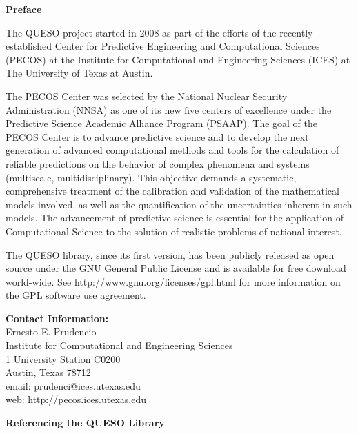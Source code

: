 \clearpage
\thispagestyle{empty}
\centerline{\Large\bf Preface}
$~$\\
The QUESO project started in 2008 as part
of the efforts of the recently established Center for Predictive Engineering and Computational Sciences (PECOS)
at the Institute for Computational and Engineering Sciences (ICES) at The University of Texas at Austin.

The PECOS Center was selected by the National Nuclear Security Administration (NNSA) as one of its new five centers of excellence
under the Predictive Science Academic Alliance Program (PSAAP).
The goal of the PECOS Center is
to advance predictive science and to develop the next generation of advanced computational methods and tools
for the calculation of reliable predictions on the behavior of complex phenomena and systems (multiscale, multidisciplinary).
This objective demands a systematic, comprehensive treatment of the calibration and validation of the mathematical models involved,
as well as the quantification of the uncertainties inherent in such models.
The advancement of predictive science is essential for the application of Computational Science to the solution of realistic problems of national interest.

The QUESO library, since its first version, has been publicly released as open source
under the GNU General Public License and is available for free download world-wide.
See http://www.gnu.org/licenses/gpl.html for more information on the GPL software use agreement.


{\bf Contact Information:}\\
Ernesto E. Prudencio\\
Institute for Computational and Engineering Sciences\\
1 University Station C0200\\
Austin, Texas 78712\\
email: prudenci@ices.utexas.edu\\
web: http://pecos.ices.utexas.edu\\
$~$\\

\centerline{\bf Referencing the QUESO Library}

